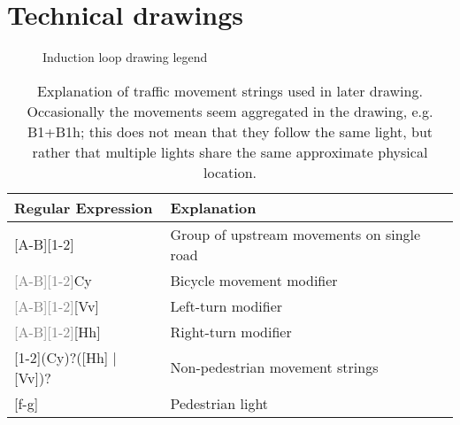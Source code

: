 \section{Technical drawings}
\label{appendix:techdraw}
\begin{figure}[!htb]
    \centering
    \caption{Induction loop drawing legend}
    \label{fig:inductionsignatures}
\end{figure}
\begin{table}[!htb]
    \centering
    \begin{tabular}{|l|l|}\hline
        Regular Expression & Explanation \\\hline
        {[A-B]}[1-2] & Group of upstream movements on single road\\\hline
        \textcolor{gray}{[A-B][1-2]}Cy & Bicycle movement modifier\\\hline
        \textcolor{gray}{[A-B][1-2]}[Vv] & Left-turn modifier\\\hline
        \textcolor{gray}{[A-B][1-2]}[Hh] & Right-turn modifier\\\hline
        [A-B][1-2](Cy)?([Hh] | [Vv])? & Non-pedestrian movement strings\\\hline
        [a-b][f-g] & Pedestrian light\\\hline
    \end{tabular}
    \caption{Explanation of traffic movement strings used in later drawing. Occasionally the movements seem aggregated in the drawing, e.g. B1+B1h; this does not mean that they follow the same light, but rather that multiple lights share the same approximate physical location.}
    \label{tab:intersectionmovements}
\end{table}

